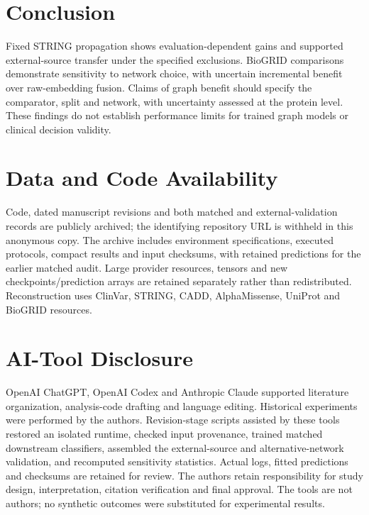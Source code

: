 \documentclass[conference]{IEEEtran}
\begin{document}
\section{Conclusion}
Fixed STRING propagation shows evaluation-dependent gains and supported external-source transfer under the specified exclusions. BioGRID comparisons demonstrate sensitivity to network choice, with uncertain incremental benefit over raw-embedding fusion. Claims of graph benefit should specify the comparator, split and network, with uncertainty assessed at the protein level. These findings do not establish performance limits for trained graph models or clinical decision validity.

\section*{Data and Code Availability}

Code, dated manuscript revisions and both matched and external-validation records are publicly archived; the identifying repository URL is withheld in this anonymous copy. The archive includes environment specifications, executed protocols, compact results and input checksums, with retained predictions for the earlier matched audit. Large provider resources, tensors and new checkpoints/prediction arrays are retained separately rather than redistributed. Reconstruction uses ClinVar, STRING, CADD, AlphaMissense, UniProt and BioGRID resources.

\section*{AI-Tool Disclosure}

OpenAI ChatGPT, OpenAI Codex and Anthropic Claude supported literature organization, analysis-code drafting and language editing. Historical experiments were performed by the authors. Revision-stage scripts assisted by these tools restored an isolated runtime, checked input provenance, trained matched downstream classifiers, assembled the external-source and alternative-network validation, and recomputed sensitivity statistics. Actual logs, fitted predictions and checksums are retained for review. The authors retain responsibility for study design, interpretation, citation verification and final approval. The tools are not authors; no synthetic outcomes were substituted for experimental results.
\end{document}
